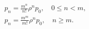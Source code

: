 \begin{equation}
    \label{eq:2}
    \begin{gathered}
    p_n=\frac{m^n}{n !} \rho^n p_0, \quad 0 \leq n<m, \\
    p_n=\frac{m^m}{m !} \rho^n p_0, \quad n \geq m .
    \end{gathered}
\end{equation}